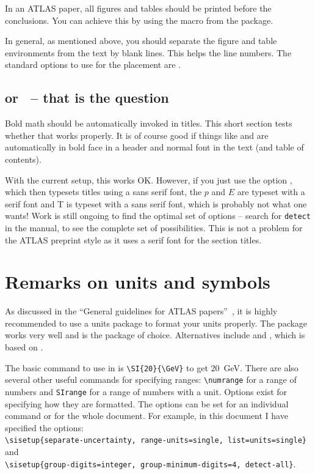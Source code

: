 In an ATLAS paper, all figures and tables should be printed before the conclusions.
You can achieve this by using the macro  from the
 package.

In general, as mentioned above, you should separate the figure and table environments from the text by blank lines.
This helps the line numbers. The standard options to use for the placement are \Option{[htbp]}.


\subsection{\pT or \ET\ -- that is the question}

Bold math should be automatically invoked in titles.
This short section tests whether that works properly.
It is of course good if things like \pT and \ET are automatically in bold face in
a header and normal font in the text (and table of contents).

With the current setup, this works OK. 
However, if you just use the option , which then typesets titles using a sans serif font,
the $p$ and $E$ are typeset with a serif font and \textsf{T} is typeset with a sans serif font,
which is probably not what one wants!
Work is still ongoing to find the optimal set of options
-- search for \texttt{detect} in the  manual, to see the complete set of possibilities.
This is not a problem for the ATLAS preprint style as it uses a serif font for the section titles.


\section{Remarks on units and symbols}

As discussed in the \enquote{General guidelines for ATLAS papers}~\cite{atlas-paper},
it is highly recommended to use a units package to format your units properly.
The package  works very well and is the package of choice.
Alternatives include  and ,
which is based on .

The basic command to use in  is \verb|\SI{20}{\GeV}| to get
\SI{20}{\GeV}. 
There are also several other useful commands for specifying ranges:
\verb|\numrange| for a range of numbers and \verb|SIrange| for a range of numbers with a unit. 
Options exist for specifying how they are formatted.
The options can be set for an individual command or for the whole document.
For example, in this document I have specified the options:\\
\verb|\sisetup{separate-uncertainty, range-units=single, list=units=single}|
and\\
\verb|\sisetup{group-digits=integer, group-minimum-digits=4, detect-all}|.

